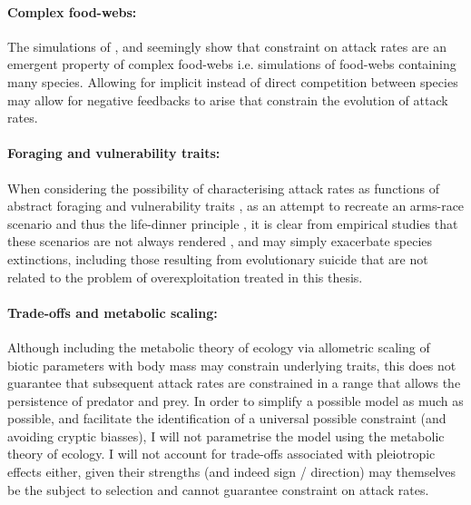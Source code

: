 \documentclass[a4paper]{report}
\begin{document}
\paragraph{Complex food-webs:} The simulations of \citep{Rossberg2008}, \citep{Pawar2009} and \citep{Pawar2012c} seemingly show that constraint on attack rates are an emergent property of complex food-webs i.e. simulations of food-webs containing many species. Allowing for implicit instead of direct competition between species may allow for negative feedbacks to arise that constrain the evolution of attack rates. \\

\paragraph{Foraging and vulnerability traits:} When considering the possibility of characterising attack rates as functions of abstract foraging and vulnerability traits \citep{rossberg09:_how_troph_inter_stren_depen_trait}, as an attempt to recreate an arms-race scenario and thus the life-dinner principle \citep{arms_race}, it is clear from empirical studies that these scenarios are not always rendered \citep{Abrams1986}, and may simply exacerbate species extinctions, including those resulting from evolutionary suicide that are not related to the problem of overexploitation treated in this thesis. \\

\paragraph{Trade-offs and metabolic scaling:} Although including the metabolic theory of ecology via allometric scaling of biotic parameters with body mass may constrain underlying traits, this does not guarantee that subsequent attack rates are constrained in a range that allows the persistence of predator and prey. In order to simplify a possible model as much as possible, and facilitate the identification of a universal possible constraint (and avoiding cryptic biasses), I will not parametrise the model using the metabolic theory of ecology. I will not account for trade-offs associated with pleiotropic effects either, given their strengths (and indeed sign / direction) may themselves be the subject to selection and cannot guarantee constraint on attack rates. \\
\end{document}
